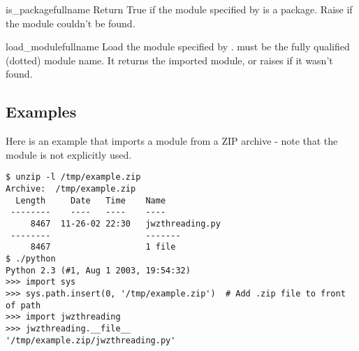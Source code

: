 \begin{methoddesc}{is_package}{fullname}
  Return True if the module specified by  is a package.
  Raise  if the module couldn't be found.
\end{methoddesc}

\begin{methoddesc}{load_module}{fullname}
  Load the module specified by .  must be the
  fully qualified (dotted) module name. It returns the imported
  module, or raises  if it wasn't found.
\end{methoddesc}

\subsection{Examples}

Here is an example that imports a module from a ZIP archive - note that
the  module is not explicitly used.

\begin{verbatim}
$ unzip -l /tmp/example.zip
Archive:  /tmp/example.zip
  Length     Date   Time    Name
 --------    ----   ----    ----
     8467  11-26-02 22:30   jwzthreading.py
 --------                   -------
     8467                   1 file
$ ./python
Python 2.3 (#1, Aug 1 2003, 19:54:32) 
>>> import sys
>>> sys.path.insert(0, '/tmp/example.zip')  # Add .zip file to front of path
>>> import jwzthreading
>>> jwzthreading.__file__
'/tmp/example.zip/jwzthreading.py'
\end{verbatim}

